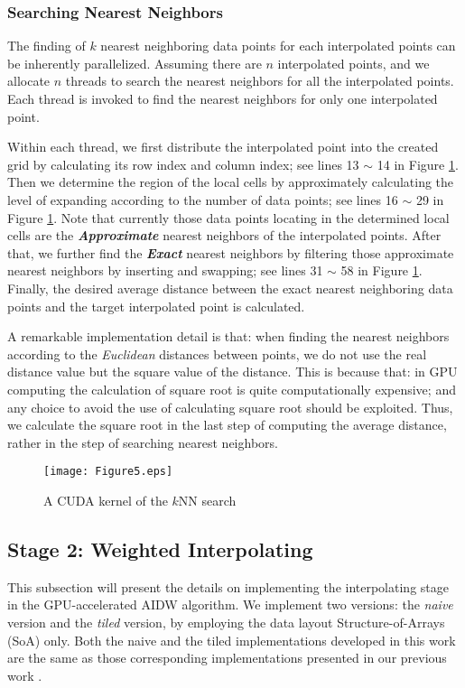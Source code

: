 \documentclass[final,5p,times,twocolumn,authoryear]{elsarticle}
\begin{document}
			\subsubsection{Searching Nearest Neighbors}
			
			The finding of $k$ nearest neighboring data points for each interpolated points 
			can be inherently parallelized. Assuming there are $n$ interpolated points, and 
			we allocate $n$ threads to search the nearest neighbors for all the 
			interpolated points. Each thread is invoked to find the nearest neighbors 
			for only one interpolated point. 
			
			Within each thread, we first distribute the interpolated point into the 
			created grid by calculating its row index and column index; see lines 13 
			$\sim $ 14 in Figure \ref{fig5}. Then we determine the region of the local cells by 
			approximately calculating the level of expanding according to the number of 
			data points; see lines 16 $\sim $ 29 in Figure \ref{fig5}. Note that currently those 
			data points locating in the determined local cells are the 
			\textbf{\textit{Approximate}} nearest neighbors of the interpolated points. 
			After that, we further find the \textbf{\textit{Exact}} nearest neighbors by 
			filtering those approximate nearest neighbors by inserting and swapping; see 
			lines 31 $\sim $ 58 in Figure \ref{fig5}. Finally, the desired average distance 
			between the exact nearest neighboring data points and the target 
			interpolated point is calculated. 
			
			A remarkable implementation detail is that: when finding the nearest 
			neighbors according to the \textit{Euclidean} distances between points, we do not use the real 
			distance value but the square value of the distance. This is because that: 
			in GPU computing the calculation of square root is quite computationally 
			expensive; and any choice to avoid the use of calculating square root should 
			be exploited. Thus, we calculate the square root in the last step of 
			computing the average distance, rather in the step of searching nearest 
			neighbors.

			\begin{figure}[!h]
				\centering
				\texttt{[image: Figure5.eps]}
				\caption{A CUDA kernel of the $k$NN search}
				\label{fig5}
			\end{figure}	

			
			\subsection{Stage 2: Weighted Interpolating}
			This subsection will present the details on implementing the interpolating 
			stage in the GPU-accelerated AIDW algorithm. We implement two versions: the 
			\textit{naive} version and the \textit{tiled} version, by employing the data layout Structure-of-Arrays 
			(SoA) only. Both the naive and the tiled implementations developed in this 
			work are the same as those corresponding implementations presented in our 
			previous work \citep{29DBLP:journals/corr/MeiXX15}.
			
\end{document}
